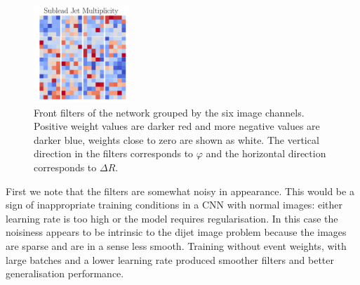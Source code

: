 \begin{figure}[h!]
\begin{center}
        \includegraphics[width=0.32\textwidth]{figures/event_selection/front_filters_channel_5.pdf}
    \end{center}
    \caption{Front filters of the network grouped by the six image channels. Positive weight values are darker red and more negative values are darker blue, weights close to zero are shown as white. The vertical direction in the filters corresponds to $\varphi$ and the horizontal direction corresponds to $\Delta{R}$.}
    \label{fig:event_categorisation:front_filters}
\end{figure}

First we note that the filters are somewhat noisy in appearance. This would be a sign of inappropriate training conditions in a CNN with normal images: either learning rate is too high or the model requires regularisation. 
In this case the noisiness appears to be intrinsic to the dijet image problem because the images are sparse and are in a sense less smooth. Training without event weights, with large batches and a lower learning rate produced smoother filters and better generalisation performance.  

